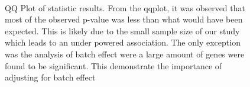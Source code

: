 \documentclass[12pt]{scrbook}
\begin{document}
\begin{figure}
{		\label{fig:omegaSALWald}
	}\\
	\caption[QQ Plot Statistic Results]
	{QQ Plot of statistic results.
		From the \gls{qqplot}, it was observed that most of the observed p-value was less than what would have been expected. 
		This is likely due to the small sample size of our study which leads to an under powered association.
		The only exception was the analysis of batch effect were a large amount of genes were found to be significant. 
		This demonstrate the importance of adjusting for batch effect} 
	\label{fig:waldQQ}
\end{figure}
\end{document}
